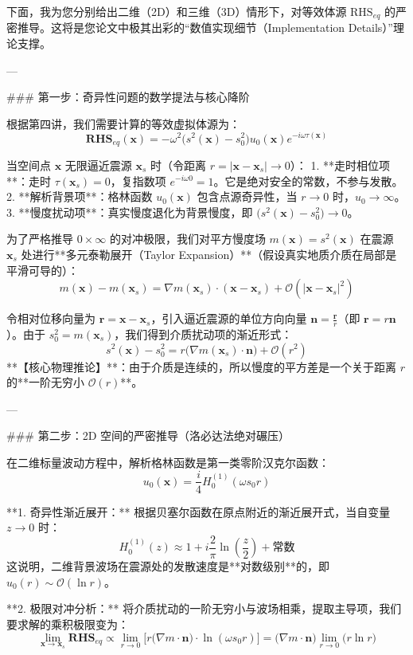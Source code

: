 \documentclass[12pt]{article}
\begin{document}
{下面，我为您分别给出二维（2D）和三维（3D）情形下，对等效体源 $\text{RHS}_{eq}$ 的严密推导。这将是您论文中极其出彩的“数值实现细节（Implementation Details）”理论支撑。

---

### 第一步：奇异性问题的数学提法与核心降阶

根据第四讲，我们需要计算的等效虚拟体源为：
$$
\mathbf{RHS}_{eq}(\mathbf{x}) = -\omega^2 \big( s^2(\mathbf{x}) - s_0^2 \big) u_0(\mathbf{x}) e^{-i \omega \tau(\mathbf{x})}
$$

当空间点 $\mathbf{x}$ 无限逼近震源 $\mathbf{x}_s$ 时（令距离 $r = |\mathbf{x} - \mathbf{x}_s| \to 0$）：
1. **走时相位项**：走时 $\tau(\mathbf{x}_s) = 0$，复指数项 $e^{-i \omega 0} = 1$。它是绝对安全的常数，不参与发散。
2. **解析背景项**：格林函数 $u_0(\mathbf{x})$ 包含点源奇异性，当 $r \to 0$ 时，$u_0 \to \infty$。
3. **慢度扰动项**：真实慢度退化为背景慢度，即 $\big( s^2(\mathbf{x}) - s_0^2 \big) \to 0$。

为了严格推导 $0 \times \infty$ 的对冲极限，我们对平方慢度场 $m(\mathbf{x}) = s^2(\mathbf{x})$ 在震源 $\mathbf{x}_s$ 处进行**多元泰勒展开（Taylor Expansion）**（假设真实地质介质在局部是平滑可导的）：
$$
m(\mathbf{x}) - m(\mathbf{x}_s) = \nabla m(\mathbf{x}_s) \cdot (\mathbf{x} - \mathbf{x}_s) + \mathcal{O}(|\mathbf{x} - \mathbf{x}_s|^2)
$$

令相对位移向量为 $\mathbf{r} = \mathbf{x} - \mathbf{x}_s$，引入逼近震源的单位方向向量 $\mathbf{n} = \frac{\mathbf{r}}{r}$（即 $\mathbf{r} = r \mathbf{n}$）。由于 $s_0^2 = m(\mathbf{x}_s)$，我们得到介质扰动项的渐近形式：
$$
s^2(\mathbf{x}) - s_0^2 = r \big( \nabla m(\mathbf{x}_s) \cdot \mathbf{n} \big) + \mathcal{O}(r^2)
$$
**【核心物理推论】**：由于介质是连续的，所以慢度的平方差是一个关于距离 $r$ 的**一阶无穷小 $\mathcal{O}(r)$**。

---

### 第二步：2D 空间的严密推导（洛必达法绝对碾压）

在二维标量波动方程中，解析格林函数是第一类零阶汉克尔函数：
$$
u_0(\mathbf{x}) = \frac{i}{4} H_0^{(1)}(\omega s_0 r)
$$

**1. 奇异性渐近展开：**
根据贝塞尔函数在原点附近的渐近展开式，当自变量 $z \to 0$ 时：
$$
H_0^{(1)}(z) \approx 1 + i \frac{2}{\pi} \ln\left(\frac{z}{2}\right) + \text{常数}
$$
这说明，二维背景波场在震源处的发散速度是**对数级别**的，即 $u_0(r) \sim \mathcal{O}(\ln r)$。

**2. 极限对冲分析：**
将介质扰动的一阶无穷小与波场相乘，提取主导项，我们要求解的乘积极限变为：
$$
\lim_{\mathbf{x} \to \mathbf{x}_s} \mathbf{RHS}_{eq} \propto \lim_{r \to 0} \Big[ r \big(\nabla m \cdot \mathbf{n}\big) \cdot \ln(\omega s_0 r) \Big] = \big(\nabla m \cdot \mathbf{n}\big) \lim_{r \to 0} \big( r \ln r \big)
$$

}
\end{document}
